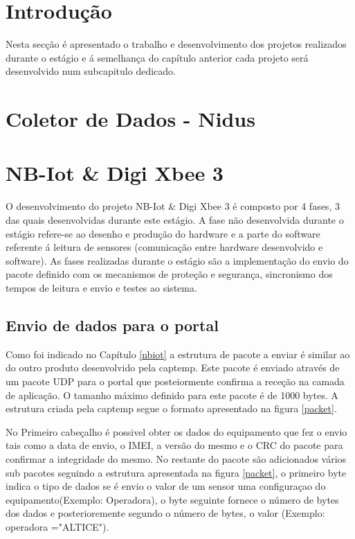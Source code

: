 \section{Introdução}
Nesta secção é apresentado o trabalho e desenvolvimento dos projetos realizados durante o estágio e á semelhança do capítulo anterior cada projeto será desenvolvido num subcapitulo dedicado.

\section{Coletor de Dados - Nidus} 
\par



\section {NB-Iot \& Digi Xbee 3 }
\par
O desenvolvimento do projeto NB-Iot \& Digi Xbee 3  é composto por 4 fases, 3 das quais desenvolvidas durante este estágio. A fase não desenvolvida durante o estágio refere-se ao desenho e produção do hardware e a parte do software referente á leitura de sensores (comunicação entre hardware desenvolvido e software). As fases realizadas durante o estágio são a implementação do envio do pacote definido com os mecanismos de proteção e segurança, sincronismo dos tempos de leitura e envio e testes ao sistema.

\subsection {Envio de dados para o portal}

\par Como foi indicado no Capítulo \ref{nbiot} a estrutura de pacote a enviar é similar ao do outro produto desenvolvido pela captemp. Este pacote é enviado através de um pacote UDP para o portal que posteiormente confirma a receção na camada de aplicação. O tamanho máximo definido para este pacote é de 1000 bytes.
A estrutura criada pela captemp segue o formato apresentado na figura \ref{packet}.
\par No Primeiro cabeçalho é possivel obter os dados do equipamento que fez o envio tais como a data de envio, o IMEI, a versão do mesmo e o CRC do pacote para confirmar a integridade do mesmo. No restante do pacote são adicionados vários sub pacotes seguindo a estrutura apresentada na figura \ref {packet}, o primeiro byte indica o tipo de dados se é envio o valor de um sensor uma configuraçao do equipamento(Exemplo: Operadora), o byte seguinte fornece o número de bytes dos dados e posterioremente segundo o número de bytes, o valor (Exemplo: operadora ="ALTICE").

